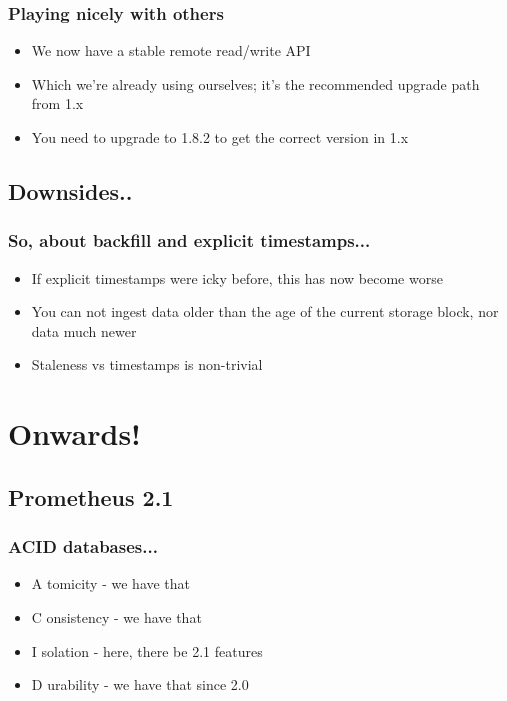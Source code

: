 \documentclass[t]{beamer}
\begin{document}
\begin{frame}
	\frametitle{Playing nicely with others}
	\begin{itemize}
		\item We now have a stable remote read/write API
		\item Which we're already using ourselves; it's the recommended upgrade path from 1.x
		\item You need to upgrade to 1.8.2 to get the correct version in 1.x
	\end{itemize}
\end{frame}


\subsection{Downsides..}

\begin{frame}
	\frametitle{So, about backfill and explicit timestamps...}
	\begin{itemize}
		\item If explicit timestamps were icky before, this has now become worse
		\item You can not ingest data older than the age of the current storage block, nor data much newer
		\item Staleness vs timestamps is non-trivial
	\end{itemize}
\end{frame}



\section{Onwards!}


\subsection{Prometheus 2.1}

\begin{frame}
	\frametitle{ACID databases...}
	\begin{itemize}
		\item A tomicity - we have that
		\item C onsistency - we have that
		\item I solation - here, there be 2.1 features
		\item D urability - we have that since 2.0
	\end{itemize}
\end{frame}
\end{document}
